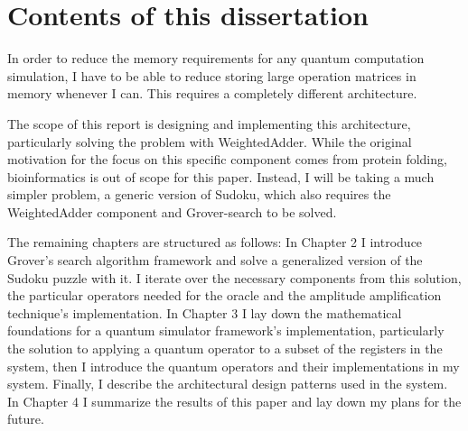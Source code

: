 \section{Contents of this dissertation}

In order to reduce the memory requirements for any quantum computation simulation, I have to be able to reduce storing large operation matrices in memory whenever I can. This requires a completely different architecture.

The scope of this report is designing and implementing this architecture, particularly solving the problem with WeightedAdder. While the original motivation for the focus on this specific component comes from protein folding, bioinformatics is out of scope for this paper. Instead, I will be taking a much simpler problem, a generic version of Sudoku, which also requires the WeightedAdder component and Grover-search to be solved.

The remaining chapters are structured as follows: In Chapter 2 I introduce Grover's search algorithm framework and solve a generalized version of the Sudoku puzzle with it. I iterate over the necessary components from this solution, the particular operators needed for the oracle and the amplitude amplification technique's implementation. In Chapter 3 I lay down the mathematical foundations for a quantum simulator framework's implementation, particularly the solution to applying a quantum operator to a subset of the registers in the system, then I introduce the quantum operators and their implementations in my system. Finally, I describe the architectural design patterns used in the system. In Chapter 4 I summarize the results of this paper and lay down my plans for the future.
